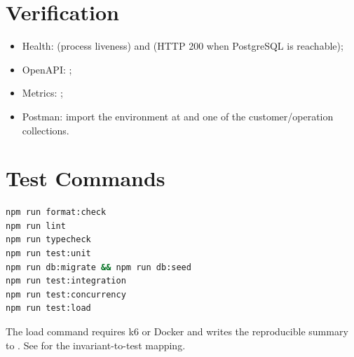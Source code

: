 \section{Verification}
\begin{itemize}[nosep,leftmargin=*]
  \item Health:  (process liveness) and
   (HTTP 200 when PostgreSQL is reachable);
  \item OpenAPI: ;
  \item Metrics: ;
  \item Postman: import the environment at
  \allowbreak{} and one of the
  customer/operation collections.
\end{itemize}

\section{Test Commands}
\begin{lstlisting}[language=bash,caption={Final quality gates}]
npm run format:check
npm run lint
npm run typecheck
npm run test:unit
npm run db:migrate && npm run db:seed
npm run test:integration
npm run test:concurrency
npm run test:load
\end{lstlisting}

The load command requires k6 or Docker and writes the reproducible summary to
. See  for the
invariant-to-test mapping.
